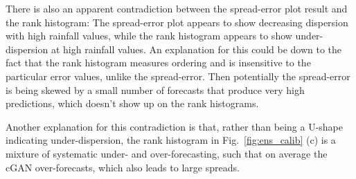 \documentclass{article}
\begin{document}
There is also an apparent contradiction between the spread-error plot result and the rank histogram: The spread-error plot appears to show decreasing dispersion with high rainfall values, while the rank histogram appears to show under-dispersion at high rainfall values. An explanation for this could be down to the fact that the rank histogram measures ordering and is insensitive to the particular error values, unlike the spread-error. Then potentially the spread-error is being skewed by a small number of forecasts that produce very high predictions, which doesn't show up on the rank histograms.

Another explanation for this contradiction is that, rather than being a U-shape indicating under-dispersion, the rank histogram in Fig.~\ref{fig:ens_calib} (c) is a mixture of systematic under- and over-forecasting, such that on average the cGAN over-forecasts, which also leads to large spreads.

    




\end{document}
